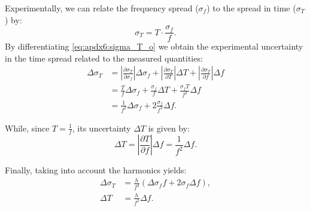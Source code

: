 Experimentally, we can relate the frequency spread ($\sigma_{f}$) to the spread in time ($\sigma_{T}$) by:
\begin{equation}\label{eq:apdx6:sigma_T_o}
\sigma_T = T \cdot \frac{\sigma_{f}}{f}.
\end{equation}
By differentiating \cref*{eq:apdx6:sigma_T_o} we obtain the experimental uncertainty in the time spread related to the measured quantities:
\begin{align}
  \Delta \sigma_T &= \left|\frac{\partial \sigma_T}{\partial \sigma_f}\right| \Delta \sigma_f + \left|\frac{\partial \sigma_T}{\partial T}\right| \Delta T + \left|\frac{\partial \sigma_T}{\partial f}\right| \Delta f \nonumber \\
  &= \frac{T}{f}\Delta \sigma_f + \frac{\sigma_f}{f}\Delta T + \frac{\sigma_f T}{f^2}\Delta f \nonumber \\
  &= \frac{1}{f^2}\Delta \sigma_f + 2\frac{\sigma_f}{f^3}\Delta f.
\end{align}

While, since $T= \frac{1}{f}$, its uncertainty $\Delta T$ is given by:
\begin{equation}
  \Delta T = \left|\frac{\partial T}{\partial f}\right| \Delta f = \frac{1}{f^2}\Delta f.
\end{equation}

Finally, taking into account the harmonics yields:
\begin{align}
  \Delta \sigma_T &= \frac{h}{f^3}\left(\Delta \sigma_f f + 2\sigma_f\Delta f\right),\\
  \Delta T &= \frac{h}{f^2}\Delta f.
\end{align}

